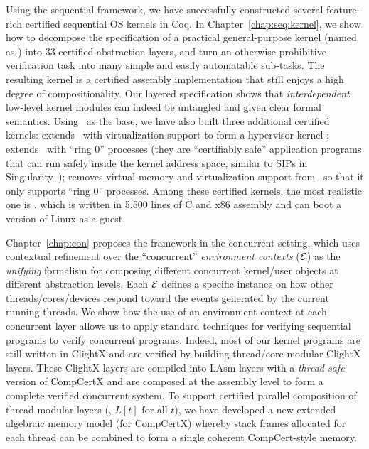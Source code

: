 
Using the sequential \CTOS{} framework, we have successfully
  constructed several feature-rich certified sequential OS kernels in Coq.
In   Chapter~\ref{chap:seq:kernel},
we show how to decompose the specification of 
a practical general-purpose kernel
(named as \textbf{\mCTOS{}})
into 33 certified abstraction layers, and turn an otherwise 
  prohibitive verification task into many simple and easily automatable 
  sub-tasks.  The resulting kernel is a certified assembly implementation 
  that still enjoys a high degree of compositionality.
  Our layered specification shows that
  {\em interdependent} low-level kernel modules can indeed be
  untangled and given clear formal semantics.
 Using \mCTOS\ as the base, we have also built three additional
  certified kernels: {\bf{}\mCTOShyper} extends \mCTOS\ with virtualization
  support to form a hypervisor kernel ;
  {\bf{}\mCTOSringz} extends \mCTOShyper\ with ``ring 0'' processes
  (they are ``certifiably safe'' application programs that can run safely 
  inside the kernel address space, similar to SIPs in 
  Singularity~\cite{hunt07}); {\bf{}\mCTOSembed} removes virtual memory
  and virtualization support from \mCTOSringz\ so that it only supports 
  ``ring 0'' processes.
  Among these certified kernels,
  the most realistic one is \mCTOShyper{},
  which is written in 5,500 lines of C and x86
assembly and can boot a version of Linux as a guest.   
  
 Chapter~\ref{chap:con} proposes 
the \CTOS{} framework in the concurrent setting,
 which uses
  contextual refinement over the ``concurrent'' {\em environment contexts}
  ($\mathcal{E}$) as the {\em unifying} formalism for composing 
  different concurrent kernel/user objects at different
  abstraction levels.  Each $\mathcal{E}$ defines a specific instance on how
  other threads/cores/devices respond toward the events generated by
  the current running threads.  
We show how the use of an environment context at each
  concurrent layer allows us to apply standard techniques for
  verifying sequential programs to verify concurrent programs.
   Indeed, most of our kernel programs are still written 
   in ClightX and are verified by building
   thread/core-modular ClightX layers.
 These ClightX layers are compiled
 into LAsm layers
   with a {\em thread-safe} version of CompCertX
   and are composed at the assembly level to form
   a complete verified concurrent system.
 To support certified parallel composition of
  thread-modular layers (\ie, $L[t]$ for all $t$), we have developed
  a new extended algebraic memory model (for CompCertX) whereby stack
  frames allocated for each thread can be combined to form a single
  coherent CompCert-style memory.

